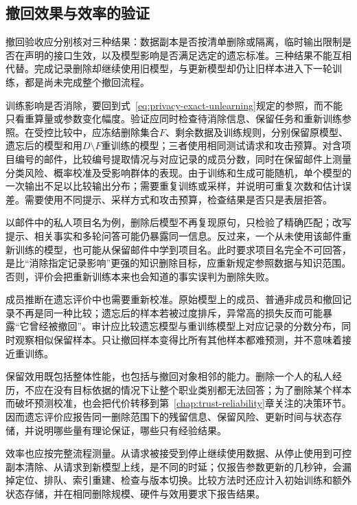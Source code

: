 \subsection{撤回效果与效率的验证}
\label{sec:privacy-unlearning-validation}

撤回验收应分别核对三种结果：数据副本是否按清单删除或隔离，临时输出限制是否在声明的接口生效，以及模型影响是否满足选定的遗忘标准。三种结果不能互相代替。完成记录删除却继续使用旧模型，与更新模型却仍让旧样本进入下一轮训练，都是尚未完成整个撤回流程。

训练影响是否消除，要回到式~\eqref{eq:privacy-exact-unlearning}规定的参照，而不能只看重算量或参数变化幅度。验证应同时检查待消除信息、保留任务和重新训练参照。在受控比较中，应冻结删除集合$F$、剩余数据及训练规则，分别保留原模型、遗忘后的模型和用$D\setminus F$重训练的模型；三者使用相同测试请求和攻击预算。对含项目编号的邮件，比较编号提取情况与对应记录的成员分数，同时在保留邮件上测量分类风险、概率校准及受影响群体的表现。由于训练和生成可能随机，单个模型的一次输出不足以比较输出分布；需要重复训练或采样，并说明可重复次数和估计误差。需要使用不同提示、采样方式和攻击预算，检查结果是否只是表层拒答。

以邮件中的私人项目名为例，删除后模型不再复现原句，只检验了精确匹配；改写提示、相关事实和多轮问答可能仍暴露同一信息。反过来，一个从未使用该邮件重新训练的模型，也可能从保留邮件中学到项目名。此时要求项目名完全不可回答，是比“消除指定记录影响”更强的知识删除目标，应重新规定参照数据与知识范围。否则，评价会把重新训练本来也会知道的事实误判为删除失败。

成员推断在遗忘评价中也需要重新校准。原始模型上的成员、普通非成员和撤回记录不再是同一种比较；遗忘后的样本若被过度排斥，异常高的损失反而可能暴露“它曾经被撤回”。审计应比较遗忘模型与重训练模型上对应记录的分数分布，同时观察相似保留样本。只让撤回样本变得比所有其他样本都难预测，并不意味着接近重训练。

保留效用既包括整体性能，也包括与撤回对象相邻的能力。删除一个人的私人经历，不应在没有目标依据的情况下让整个职业类别都无法回答；为了删除某个样本而破坏预测校准，也会把代价转移到第~\ref{chap:trust-reliability}章关注的决策环节。因而遗忘评价应报告同一删除范围下的残留信息、保留风险、更新时间与状态存储，并说明哪些量有理论保证，哪些只有经验结果。

效率也应按完整流程测量。从请求被接受到停止继续使用数据、从停止使用到可控副本清除、从请求到新模型上线，是不同的时延；仅报告参数更新的几秒钟，会漏掉定位、排队、索引重建、检查与版本切换。比较方法时还应计入初始训练和额外状态存储，并在相同删除规模、硬件与效用要求下报告结果。

